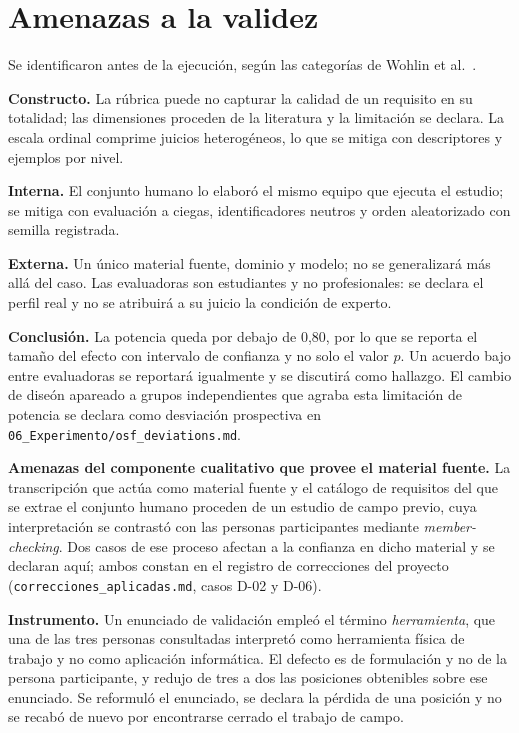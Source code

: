 \documentclass[runningheads]{llncs}
\begin{document}
\section{Amenazas a la validez}

Se identificaron antes de la ejecuci\'on, seg\'un las categor\'ias de Wohlin et
al.\ \cite{wohlin2012}.

\textbf{Constructo.} La r\'ubrica puede no capturar la calidad de un requisito en su
totalidad; las dimensiones proceden de la literatura \cite{iso29148,montgomery2022} y
la limitaci\'on se declara. La escala ordinal comprime juicios heterog\'eneos, lo que
se mitiga con descriptores y ejemplos por nivel.

\textbf{Interna.} El conjunto humano lo elabor\'o el mismo equipo que ejecuta el
estudio; se mitiga con evaluaci\'on a ciegas, identificadores neutros y orden
aleatorizado con semilla registrada.

\textbf{Externa.} Un \'unico material fuente, dominio y modelo; no se generalizar\'a
m\'as all\'a del caso. Las evaluadoras son estudiantes y no profesionales: se declara
el perfil real y no se atribuir\'a a su juicio la condici\'on de experto.

\textbf{Conclusi\'on.} La potencia queda por debajo de 0,80, por lo que se reporta
el tama\~no del efecto con intervalo de confianza y no solo el valor $p$. Un acuerdo
bajo entre evaluadoras se reportar\'a igualmente y se discutir\'a como hallazgo. El cambio 
de dise\'on apareado a grupos independientes que agraba esta limitaci\'on de potencia se
declara como desviaci\'on prospectiva en \texttt{06\_Experimento/osf\_deviations.md}.

\medskip
\noindent\textbf{Amenazas del componente cualitativo que provee el material fuente.}
La transcripci\'on que act\'ua como material fuente y el cat\'alogo de requisitos del
que se extrae el conjunto humano proceden de un estudio de campo previo, cuya
interpretaci\'on se contrast\'o con las personas participantes mediante
\emph{member-checking}. Dos casos de ese proceso afectan a la confianza en dicho
material y se declaran aqu\'i; ambos constan en el registro de correcciones del
proyecto (\texttt{correcciones\_aplicadas.md}, casos D-02 y D-06).

\textbf{Instrumento.} Un enunciado de validaci\'on emple\'o el t\'ermino
\emph{herramienta}, que una de las tres personas consultadas interpret\'o como
herramienta f\'isica de trabajo y no como aplicaci\'on inform\'atica. El defecto es
de formulaci\'on y no de la persona participante, y redujo de tres a dos las
posiciones obtenibles sobre ese enunciado. Se reformul\'o el enunciado, se declara
la p\'erdida de una posici\'on y no se recab\'o de nuevo por encontrarse cerrado el
trabajo de campo.
\end{document}
